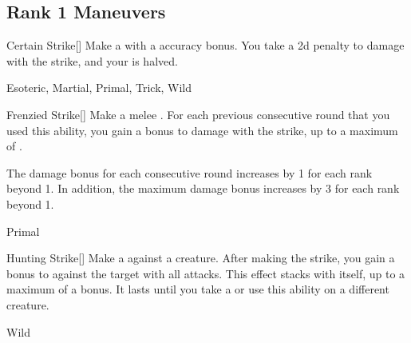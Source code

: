\subsection{Rank 1 Maneuvers}

\lowercase{\hypertarget{maneuver:Certain Strike}{}}\label{maneuver:Certain Strike}
\hypertarget{maneuver:Certain Strike}{}
\begin{freeability}[Rank 1]{Certain Strike}[]
Make a  with a  accuracy bonus.
You take a \minus2d penalty to damage with the strike, and your  is halved.


 Esoteric, Martial, Primal, Trick, Wild
\end{freeability}
\vspace{0.25em}



\lowercase{\hypertarget{maneuver:Frenzied Strike}{}}\label{maneuver:Frenzied Strike}
\hypertarget{maneuver:Frenzied Strike}{}
\begin{freeability}[Rank 1]{Frenzied Strike}[]
Make a melee .
For each previous consecutive round that you used this ability, you gain a  bonus to damage with the strike, up to a maximum of .

\rankline
The damage bonus for each consecutive round increases by 1 for each rank beyond 1.
In addition, the maximum damage bonus increases by 3 for each rank beyond 1.


 Primal
\end{freeability}
\vspace{0.25em}



\lowercase{\hypertarget{maneuver:Hunting Strike}{}}\label{maneuver:Hunting Strike}
\hypertarget{maneuver:Hunting Strike}{}
\begin{freeability}[Rank 1]{Hunting Strike}[]
Make a  against a creature.
After making the strike, you gain a  bonus to  against the target with all attacks.
This effect stacks with itself, up to a maximum of a  bonus.
It lasts until you take a  or use this ability on a different creature.


 Wild
\end{freeability}
\vspace{0.25em}



